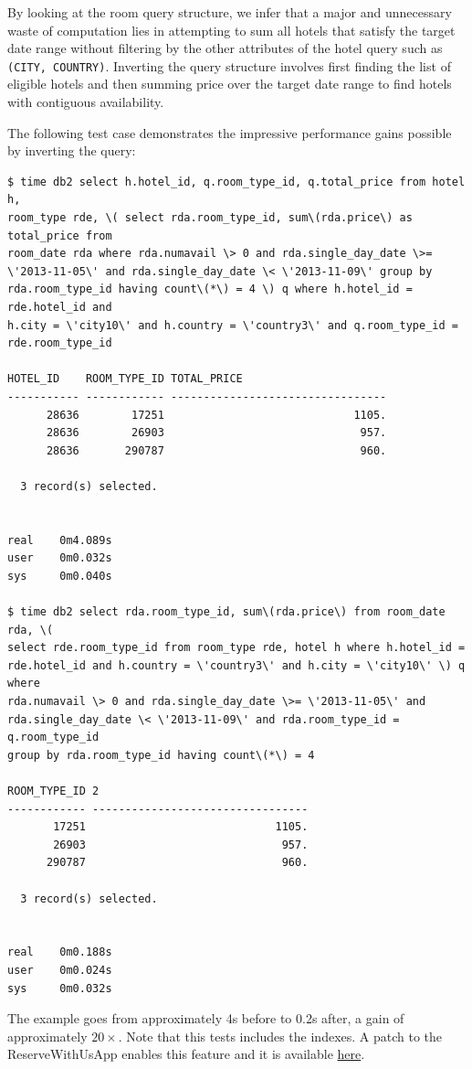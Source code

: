 \documentclass[letterpaper]{article}%
\begin{document}
By looking at the room query structure, we infer that a major and unnecessary
waste of computation lies in attempting to sum all hotels that satisfy the
target date range without filtering by the other attributes of the hotel query
such as \texttt{(CITY, COUNTRY)}. Inverting the query structure involves first
finding the list of eligible hotels and then summing price over the target date
range to find hotels with contiguous availability.

The following test case demonstrates the impressive performance gains possible
by inverting the query:
\begin{Verbatim}
$ time db2 select h.hotel_id, q.room_type_id, q.total_price from hotel h,
room_type rde, \( select rda.room_type_id, sum\(rda.price\) as total_price from
room_date rda where rda.numavail \> 0 and rda.single_day_date \>=
\'2013-11-05\' and rda.single_day_date \< \'2013-11-09\' group by
rda.room_type_id having count\(*\) = 4 \) q where h.hotel_id = rde.hotel_id and
h.city = \'city10\' and h.country = \'country3\' and q.room_type_id =
rde.room_type_id

HOTEL_ID    ROOM_TYPE_ID TOTAL_PRICE
----------- ------------ ---------------------------------
      28636        17251                             1105.
      28636        26903                              957.
      28636       290787                              960.

  3 record(s) selected.


real    0m4.089s
user    0m0.032s
sys     0m0.040s

$ time db2 select rda.room_type_id, sum\(rda.price\) from room_date rda, \(
select rde.room_type_id from room_type rde, hotel h where h.hotel_id =
rde.hotel_id and h.country = \'country3\' and h.city = \'city10\' \) q where
rda.numavail \> 0 and rda.single_day_date \>= \'2013-11-05\' and
rda.single_day_date \< \'2013-11-09\' and rda.room_type_id = q.room_type_id
group by rda.room_type_id having count\(*\) = 4

ROOM_TYPE_ID 2
------------ ---------------------------------
       17251                             1105.
       26903                              957.
      290787                              960.

  3 record(s) selected.


real    0m0.188s
user    0m0.024s
sys     0m0.032s
\end{Verbatim}
The example goes from approximately 4s before to 0.2s after, a gain of
approximately $20\times$. Note that this tests includes the indexes. A patch
to the ReserveWithUsApp enables this feature and it is available
\href{%
https://github.com/blr246/adbs-reservewithus/commit/4662879ee3443dcf48e1a692aed957891edd8e8c%
}{here}.
\end{document}
